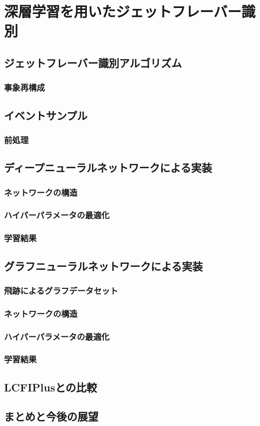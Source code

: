 
\chapter{深層学習を用いたジェットフレーバー識別} \label{sec:Flavortagging}

\section{ジェットフレーバー識別アルゴリズム}
\subsection{事象再構成}

\section{イベントサンプル}
\subsection{前処理}

\section{ディープニューラルネットワークによる実装}
\subsection{ネットワークの構造}
\subsection{ハイパーパラメータの最適化}
\subsection{学習結果}

\section{グラフニューラルネットワークによる実装}
\subsection{飛跡によるグラフデータセット}
\subsection{ネットワークの構造}
\subsection{ハイパーパラメータの最適化}
\subsection{学習結果}

\section{LCFIPlusとの比較}

\section{まとめと今後の展望}